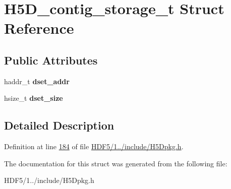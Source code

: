 \hypertarget{struct_h5_d__contig__storage__t}{}\section{H5\+D\+\_\+contig\+\_\+storage\+\_\+t Struct Reference}
\label{struct_h5_d__contig__storage__t}
\subsection*{Public Attributes}
\begin{DoxyCompactItemize}
\item 
\mbox{\label{struct_h5_d__contig__storage__t_a999e78714dc1780e828fce246bcdbde8}} 
haddr\+\_\+t {\bfseries dset\+\_\+addr}
\item 
\mbox{\label{struct_h5_d__contig__storage__t_a5932d46424a025c032cc575d0764bc6e}} 
hsize\+\_\+t {\bfseries dset\+\_\+size}
\end{DoxyCompactItemize}


\subsection{Detailed Description}


Definition at line \hyperlink{_h_d_f5_21_810_81_2include_2_h5_dpkg_8h_source_l00184}{184} of file \hyperlink{_h_d_f5_21_810_81_2include_2_h5_dpkg_8h_source}{H\+D\+F5/1../include/\+H5\+Dpkg.\+h}.



The documentation for this struct was generated from the following file\+:\begin{DoxyCompactItemize}
\item 
H\+D\+F5/1../include/\+H5\+Dpkg.\+h\end{DoxyCompactItemize}
